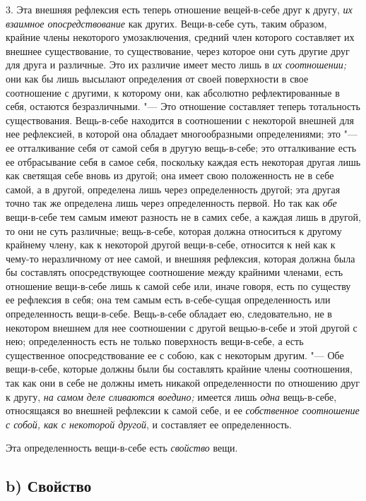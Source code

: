 3. Эта внешняя рефлексия есть теперь отношение вещей-в-себе друг к другу,
{\em их взаимное опосредствование} как других.
Вещи-в-себе суть, таким образом, крайние члены некоторого умозаключения,
средний член которого составляет их внешнее существование, то
существование, через которое они суть другие друг для друга и различные.
Это их различие имеет место лишь в {\em их соотношении;} они как бы
лишь высылают определения от своей поверхности в
свое соотношение с другими, к которому они, как абсолютно рефлектированные
в себя, остаются безразличными. "--- Это отношение составляет теперь
тотальность существования. Вещь-в-себе находится в соотношении с некоторой
внешней для нее рефлексией, в которой она обладает многообразными
определениями; это "--- ее отталкивание себя от самой себя в другую вещь-в-себе;
это отталкивание есть ее отбрасывание себя в самое себя, поскольку каждая
есть некоторая другая лишь как светящая себе вновь из другой; она имеет
свою положенность не в себе самой, а в другой, определена лишь через
определенность другой; эта другая точно так же определена лишь через
определенность первой. Но так как {\em обе} вещи-в-себе
тем самым имеют разность не в самих себе, а каждая лишь в другой, то они не
суть различные; вещь-в-себе, которая должна относиться к другому крайнему
члену, как к некоторой другой вещи-в-себе, относится к ней как к чему-то
неразличному от нее самой, и внешняя рефлексия, которая должна была бы
составлять опосредствующее соотношение между крайними членами, есть
отношение вещи-в-себе лишь к самой себе или, иначе говоря, есть по существу
ее рефлексия в себя; она тем самым есть в-себе-сущая определенность или
определенность вещи-в-себе. Вещь-в-себе обладает ею, следовательно, не в
некотором внешнем для нее соотношении с другой вещью-в-себе и этой другой с
нею; определенность есть не только поверхность вещи-в-себе, а есть
существенное опосредствование ее с собою, как с некоторым другим. "--- Обе
вещи-в-себе, которые должны были бы составлять крайние члены соотношения,
так как они в себе не должны иметь никакой определенности по отношению друг
к другу, {\em на самом деле сливаются воедино;} имеется лишь {\em одна}
вещь-в-себе, относящаяся во внешней рефлексии к самой себе, и ее
{\em собственное соотношение с собой, как с некоторой другой},
и составляет ее определенность.

Эта определенность вещи-в-себе есть {\em свойство} вещи.

\subsection[b) Свойство]{b) Свойство}

